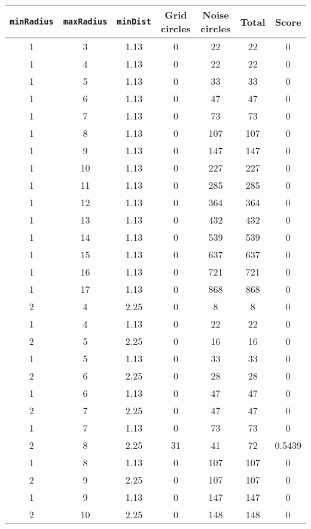 \documentclass[letterpaper, 12pt]{article}
\begin{document}
\begin{longtable}{|c|c|c|c|c|c|c|}
\hline
\textbf{\texttt{minRadius}} & \textbf{\texttt{maxRadius}} & \textbf{\texttt{minDist}} & \textbf{Grid circles} & \textbf{Noise circles} & \textbf{Total} & \textbf{Score} \\
\hline
1 & 3 & 1.13 & 0 & 22 & 22 & 0 \\
\hline
1 & 4 & 1.13 & 0 & 22 & 22 & 0 \\
\hline
1 & 5 & 1.13 & 0 & 33 & 33 & 0 \\
\hline
1 & 6 & 1.13 & 0 & 47 & 47 & 0 \\
\hline
1 & 7 & 1.13 & 0 & 73 & 73 & 0 \\
\hline
1 & 8 & 1.13 & 0 & 107 & 107 & 0 \\
\hline
1 & 9 & 1.13 & 0 & 147 & 147 & 0 \\
\hline
1 & 10 & 1.13 & 0 & 227 & 227 & 0 \\
\hline
1 & 11 & 1.13 & 0 & 285 & 285 & 0 \\
\hline
1 & 12 & 1.13 & 0 & 364 & 364 & 0 \\
\hline
1 & 13 & 1.13 & 0 & 432 & 432 & 0 \\
\hline
1 & 14 & 1.13 & 0 & 539 & 539 & 0 \\
\hline
1 & 15 & 1.13 & 0 & 637 & 637 & 0 \\
\hline
1 & 16 & 1.13 & 0 & 721 & 721 & 0 \\
\hline
1 & 17 & 1.13 & 0 & 868 & 868 & 0 \\
\hline
2 & 4 & 2.25 & 0 & 8 & 8 & 0 \\
\hline
1 & 4 & 1.13 & 0 & 22 & 22 & 0 \\
\hline
2 & 5 & 2.25 & 0 & 16 & 16 & 0 \\
\hline
1 & 5 & 1.13 & 0 & 33 & 33 & 0 \\
\hline
2 & 6 & 2.25 & 0 & 28 & 28 & 0 \\
\hline
1 & 6 & 1.13 & 0 & 47 & 47 & 0 \\
\hline
2 & 7 & 2.25 & 0 & 47 & 47 & 0 \\
\hline
1 & 7 & 1.13 & 0 & 73 & 73 & 0 \\
\hline
2 & 8 & 2.25 & 31 & 41 & 72 & 0.5439 \\
\hline
1 & 8 & 1.13 & 0 & 107 & 107 & 0 \\
\hline
2 & 9 & 2.25 & 0 & 107 & 107 & 0 \\
\hline
1 & 9 & 1.13 & 0 & 147 & 147 & 0 \\
\hline
2 & 10 & 2.25 & 0 & 148 & 148 & 0 \\

\end{longtable}
\end{document}
